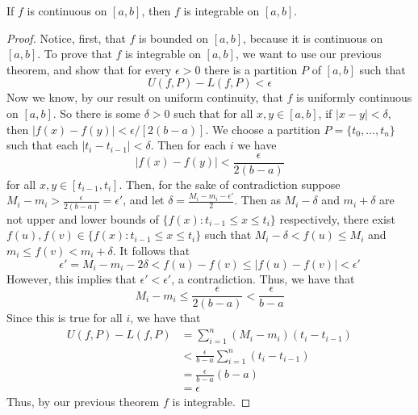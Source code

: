 \documentclass[12pt, a4paper, oneside, openright, titlepage]{book}
\begin{document}
\begin{thm}
    If $f$ is continuous on $[a,b]$, then $f$ is integrable on $[a,b]$.
\end{thm}
\begin{proof}
    Notice, first, that $f$ is bounded on $[a,b]$, because it is continuous on $[a,b]$. To prove that $f$ is integrable on $[a,b]$, we want to use our previous theorem, and show that for every $\epsilon > 0$ there is a partition $P$ of $[a,b]$ such that \begin{equation*}
        U(f,P) - L(f,P) < \epsilon
    \end{equation*}
    Now we know, by our result on uniform continuity, that $f$ is uniformly continuous on $[a,b]$. So there is some $\delta > 0$ such that for all $x,y \in [a,b]$, if $|x-y| < \delta$, then $|f(x) - f(y)| < \epsilon/[2(b-a)]$. We choose a partition $P = \{t_0,...,t_n\}$ such that each $|t_i-t_{i-1}| < \delta$. Then for each $i$ we have \begin{equation*}
        |f(x) - f(y)| < \frac{\epsilon}{2(b-a)}
    \end{equation*}
    for all $x,y \in [t_{i-1},t_i]$. Then, for the sake of contradiction suppose $M_i - m_i > \frac{\epsilon}{2(b-a)} = \epsilon'$, and let $\delta = \frac{M_i-m_i - \epsilon'}{2}$. Then as $M_i - \delta$ and $m_i + \delta$ are not upper and lower bounds of $\{f(x):t_{i-1} \leq x \leq t_i\}$ respectively, there exist $f(u),f(v) \in \{f(x):t_{i-1} \leq x \leq t_i\}$ such that $M_i - \delta < f(u) \leq M_i$ and $m_i \leq f(v) < m_i+\delta$. It follows that \begin{equation*}
        \epsilon'=M_i-m_i-2\delta < f(u) - f(v) \leq |f(u) - f(v)| < \epsilon'
    \end{equation*}
    However, this implies that $\epsilon' < \epsilon'$, a contradiction. Thus, we have that \begin{equation*}
        M_i - m_i \leq \frac{\epsilon}{2(b-a)} < \frac{\epsilon}{b-a}
    \end{equation*}
    Since this is true for all $i$, we have that \begin{align*}
        U(f,P) - L(f,P) &= \sum_{i=1}^n(M_i-m_i)(t_i-t_{i-1}) \\
        &< \frac{\epsilon}{b-a}\sum_{i=1}^n(t_i-t_{i-1}) \\
        &= \frac{\epsilon}{b-a}(b-a) \\
        &= \epsilon
    \end{align*}
    Thus, by our previous theorem $f$ is integrable.
\end{proof}
\end{document}

